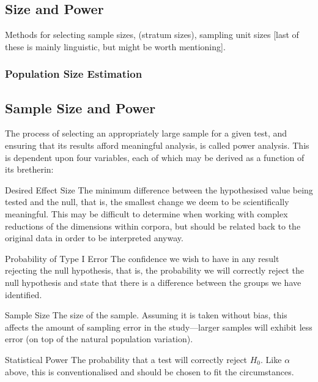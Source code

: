 \subsection{Size and Power}
Methods for selecting sample sizes, (stratum sizes), sampling unit sizes [last of these is mainly linguistic, but might be worth mentioning].

\subsubsection{Population Size Estimation}


\subsection{Sample Size and Power}
The process of selecting an appropriately large sample for a given test, and ensuring that its results afford meaningful analysis, is called power analysis.  This is dependent upon four variables, each of which may be derived as a function of its bretherin:

\begin{itemizeTitle}
\item[Desired Effect Size] The minimum difference between the hypothesised value being tested and the null, that is, the smallest change we deem to be scientifically meaningful.  This may be difficult to determine when working with complex reductions of the dimensions within corpora, but should be related back to the original data in order to be interpreted anyway. 
\item[Probability of Type I Error] The confidence we wish to have in any result rejecting the null hypothesis, that is, the probability we will correctly reject the null hypothesis and state that there is a difference between the groups we have identified.
\item[Sample Size] The size of the sample.  Assuming it is taken without bias, this affects the amount of sampling error in the study---larger samples will exhibit less error (on top of the natural population variation).
\item[Statistical Power] The probability that a test will correctly reject $H_0$.  Like $\alpha$ above, this is conventionalised and should be chosen to fit the circumstances.
\end{itemizeTitle}

